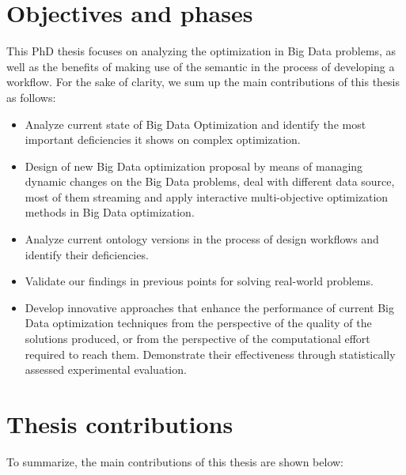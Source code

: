 \section{Objectives and phases}
This PhD thesis focuses on analyzing the optimization in Big Data problems, as well as the benefits of making use of the semantic in the process of developing a workflow. 
For the sake of clarity, we sum up the main contributions of this thesis as follows:
\begin{itemize}
\item Analyze current state of Big Data Optimization and identify the most important deficiencies it shows on complex optimization.
\item Design of new Big Data optimization proposal by means of managing dynamic changes on the Big Data problems, deal with different data source, most of them streaming and apply interactive multi-objective optimization methods in Big Data optimization.
\item Analyze current ontology versions in the process of design workflows and identify their deficiencies. 
\item Validate our findings in previous points for solving real-world problems.
\item Develop innovative approaches that enhance the performance of current Big Data optimization techniques from the perspective of the quality of the solutions produced, or from the perspective of the computational effort required to reach them. Demonstrate their effectiveness through statistically assessed experimental evaluation.

\end{itemize}



\section{Thesis contributions}
\label{sec:introduction-contributions}

To summarize, the main contributions of this thesis are shown below:


